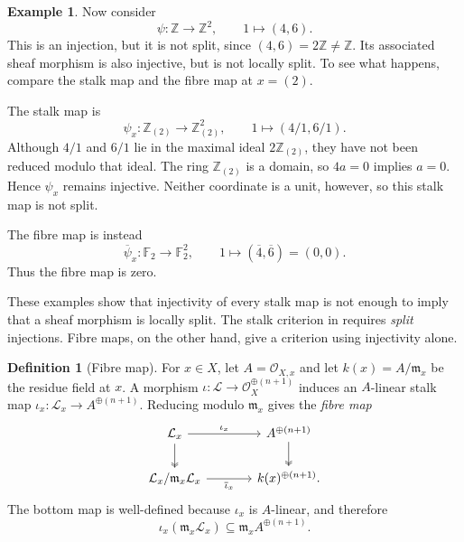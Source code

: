 \documentclass{article}
\theoremstyle{definition}
\newtheorem{example}{Example}[section]
\newtheorem{definition}{Definition}[section]
\theoremstyle{remark}
\theoremstyle{plain}
\newcommand{\Z}{\mathbb{Z}}
\newcommand{\F}{\mathbb{F}}
\begin{document}
\begin{example}\label{ex:lsi-46}
    Now consider
    \[
        \psi:\Z\longrightarrow\Z^2,
        \qquad 1\longmapsto(4,6).
    \]
    This is an injection, but it is not split, since
    \((4,6)=2\Z\ne\Z\). Its associated sheaf morphism is also injective,
    but is not locally split. To see what happens, compare the stalk
    map and the fibre map at \(x=(2)\).

    The stalk map is
    \[
        \psi_x:\Z_{(2)}\longrightarrow\Z_{(2)}^2,
        \qquad 1\longmapsto(4/1,6/1).
    \]
    Although \(4/1\) and \(6/1\) lie in the maximal ideal
    \(2\Z_{(2)}\), they have not been reduced modulo that ideal.
    The ring \(\Z_{(2)}\) is a domain, so \(4a=0\) implies \(a=0\).
    Hence \(\psi_x\) remains injective. Neither coordinate is a unit,
    however, so this stalk map is not split.

    The fibre map is instead
    \[
        \overline{\psi}_x:\F_2\longrightarrow\F_2^2,
        \qquad 1\longmapsto(\overline{4},\overline{6})=(0,0).
    \]
    Thus the fibre map is zero.
\end{example}

These examples show that injectivity of every stalk map is not enough
to imply that a sheaf morphism is locally split. The stalk criterion in
 requires \emph{split} injections. Fibre
maps, on the other hand, give a criterion using injectivity alone.

\begin{definition}[Fibre map]\label{def:lsi-fibre-map}
    For \(x\in X\), let \(A=\mathcal{O}_{X,x}\) and let
    \(k(x)=A/\mathfrak{m}_x\) be the residue field at \(x\).
    A morphism \(\iota:\mathcal{L}\to\mathcal{O}_X^{\oplus(n+1)}\)
    induces an \(A\)-linear stalk map
    \(\iota_x:\mathcal{L}_x\to A^{\oplus(n+1)}\).
    Reducing modulo \(\mathfrak{m}_x\) gives the \emph{fibre map}
    \[
    \begin{tikzcd}[column sep=large]
        \mathcal{L}_x
            \arrow[r,"\iota_x"] \arrow[d,two heads]
        & A^{\oplus(n+1)} \arrow[d,two heads] \\
        \mathcal{L}_x/\mathfrak{m}_x\mathcal{L}_x
            \arrow[r,"\overline{\iota}_x"']
        & k(x)^{\oplus(n+1)}.
    \end{tikzcd}
    \]
    The bottom map is well-defined because \(\iota_x\) is \(A\)-linear,
    and therefore
    \[
        \iota_x(\mathfrak{m}_x\mathcal{L}_x)
        \subseteq\mathfrak{m}_x A^{\oplus(n+1)}.
    \]
\end{definition}
\end{document}
